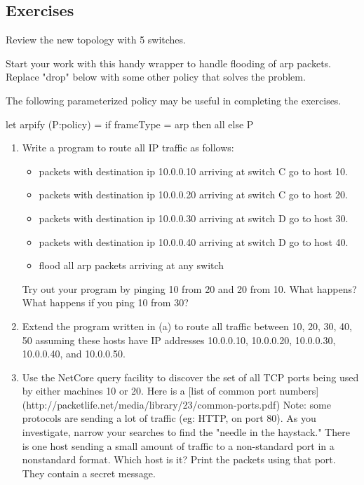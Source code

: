 \documentclass{article}
\begin{document}
\subsection{Exercises}

Review the new topology with 5 switches.  

Start your work with this handy wrapper to handle flooding of arp packets.
Replace "drop" below with some other policy that solves the problem.

The following parameterized policy may be useful in completing the
exercises.

\begin{progeg}
let arpify (P:policy) =
  if frameType = arp then all
  else P
\end{progeg}

\noindent
\begin{enumerate}
\item Write a program to route all IP traffic as follows: 
\begin{itemize}
  \item packets with destination ip 10.0.0.10 arriving at switch C go to host 10.  
  \item packets with destination ip 10.0.0.20 arriving at switch C go to host 20.  
  \item packets with destination ip 10.0.0.30 arriving at switch D go to host 30.  
  \item packets with destination ip 10.0.0.40 arriving at switch D go to host 40.  
  \item flood all arp packets arriving at any switch
\end{itemize}
Try out your program by pinging 10 from 20 and 20 from 10.  What happens?
What happens if you ping 10 from 30?

\item
Extend the program written in (a) to route all traffic between
10, 20, 30, 40, 50 assuming these hosts have IP addresses 
10.0.0.10, 10.0.0.20, 10.0.0.30, 10.0.0.40, and 10.0.0.50.

\item Use the NetCore query facility to discover the set of all TCP ports 
being used by either machines 10 or 20.  Here is a [list of common port
numbers](http://packetlife.net/media/library/23/common-ports.pdf)
Note: some protocols are sending a lot of traffic (eg: HTTP, on port
80).  As you investigate, narrow your searches to find the "needle in
the haystack."  There is one host sending a small amount of traffic to
a non-standard port in a nonstandard format.  Which host is it?  Print
the packets using that port.  They contain a secret message.


\end{enumerate}
\end{document}
